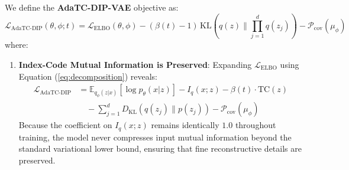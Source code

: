 \documentclass[11pt,a4paper]{article}
\begin{document}
We define the \textbf{AdaTC-DIP-VAE} objective as:
\begin{equation}
\mathcal{L}_{\text{AdaTC-DIP}}(\theta, \phi; t) = \mathcal{L}_{\text{ELBO}}(\theta, \phi) - (\beta(t) - 1) \, \text{KL}\left(q(z) \parallel \prod_{j=1}^d q(z_j)\right) - \mathcal{P}_{\text{cov}}(\mu_\phi)
\label{eq:proposed_obj}
\end{equation}
where:
\begin{enumerate}
    \item \textbf{Index-Code Mutual Information is Preserved}:
    Expanding $\mathcal{L}_{\text{ELBO}}$ using Equation (\ref{eq:decomposition}) reveals:
    \begin{equation}
    \begin{aligned}
    \mathcal{L}_{\text{AdaTC-DIP}} &= \mathbb{E}_{q_\phi(z|x)}[\log p_\theta(x|z)] - I_q(x; z) - \beta(t) \cdot \text{TC}(z) \\
    &\quad - \sum_{j=1}^d D_{\text{KL}}(q(z_j) \parallel p(z_j)) - \mathcal{P}_{\text{cov}}(\mu_\phi)
    \end{aligned}
    \end{equation}
    Because the coefficient on $I_q(x; z)$ remains identically $1.0$ throughout training, the model never compresses input mutual information beyond the standard variational lower bound, ensuring that fine reconstructive details are preserved.


\end{enumerate}
\end{document}

